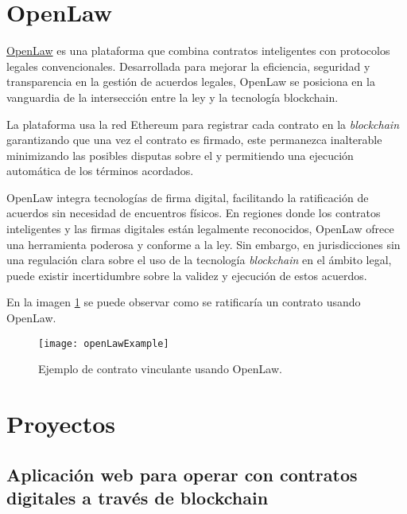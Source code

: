 
\section{OpenLaw}

\href{https://www.openlaw.io/}{OpenLaw} es una plataforma que combina contratos inteligentes con protocolos legales convencionales.
Desarrollada para mejorar la eficiencia, seguridad y transparencia en la gestión de acuerdos legales, OpenLaw se posiciona en la vanguardia de la intersección entre la ley y la tecnología blockchain.

La plataforma usa la red Ethereum para registrar cada contrato  en la \textit{blockchain} garantizando que una vez el contrato es firmado, este permanezca inalterable minimizando las posibles disputas sobre el y permitiendo una ejecución automática de los términos acordados.

OpenLaw integra tecnologías de firma digital, facilitando la ratificación de acuerdos sin necesidad de encuentros físicos.
En regiones donde los contratos inteligentes y las firmas digitales están legalmente reconocidos, OpenLaw ofrece una herramienta poderosa y conforme a la ley. Sin embargo, en jurisdicciones sin una regulación clara sobre el uso de la tecnología \textit{blockchain} en el ámbito legal, puede existir incertidumbre sobre la validez y ejecución de estos acuerdos.

En la imagen \ref{img:openLawExample} se puede observar como se ratificaría un contrato usando OpenLaw.

\begin{figure}[h]
	\label{img:openLawExample}
	\centering
	\texttt{[image: openLawExample]}
	\caption[Ejemplo OpenLaw]{Ejemplo de contrato vinculante usando OpenLaw.}
\end{figure}

\section{Proyectos}

\subsection{Aplicación web para operar con contratos digitales a través
de blockchain}